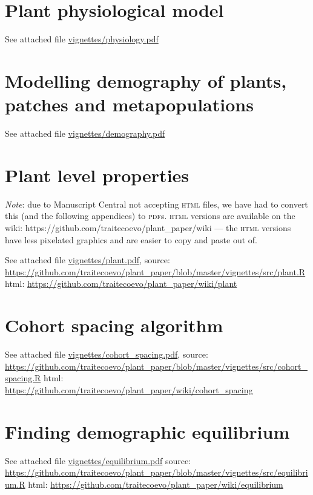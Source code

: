 \documentclass[a4paper,11pt]{article}
\newcommand{\smurl}[1]{{\footnotesize\url{#1}}}
\begin{document}
\begin{appendices}\label{sec:appendices}

\section{Plant physiological model}\label{sec:FFW16}

See attached file \url{vignettes/physiology.pdf}

\section{Modelling demography of plants, patches and metapopulations}\label{sec:demography}

See attached file \url{vignettes/demography.pdf}

\section{Plant level properties}\label{sec:plant}

\emph{Note}: due to Manuscript Central not accepting \textsc{html}
files, we have had to convert this (and the following appendices) to
\textsc{pdf}s.  \textsc{html} versions are available on the wiki:
https://github.com/traitecoevo/plant\_paper/wiki --- the \textsc{html}
versions have less pixelated graphics and are easier to copy and
paste out of.

See attached file \url{vignettes/plant.pdf}, 
source:
\smurl{https://github.com/traitecoevo/plant\_paper/blob/master/vignettes/src/plant.R}
html: \smurl{https://github.com/traitecoevo/plant\_paper/wiki/plant}

\section{Cohort spacing algorithm}\label{sec:cohort-spacing}

See attached file \url{vignettes/cohort_spacing.pdf},
source:
\smurl{https://github.com/traitecoevo/plant\_paper/blob/master/vignettes/src/cohort_spacing.R}
html: \smurl{https://github.com/traitecoevo/plant\_paper/wiki/cohort_spacing}

\section{Finding demographic equilibrium}\label{sec:equilibrium}

See attached file \url{vignettes/equilibrium.pdf}
source:
\smurl{https://github.com/traitecoevo/plant\_paper/blob/master/vignettes/src/equilibrium.R}
html: \smurl{https://github.com/traitecoevo/plant\_paper/wiki/equilibrium}


\end{appendices}
\end{document}
